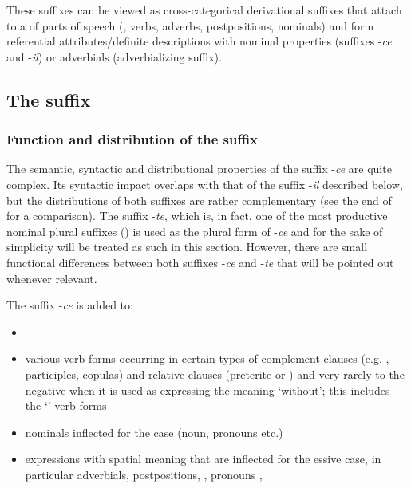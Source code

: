 These suffixes can be viewed as cross-categorical derivational suffixes that attach to a  of parts of speech (, verbs, adverbs, postpositions, nominals) and form referential attributes\slash definite descriptions with nominal properties (suffixes -\textit{ce} and -\textit{il}) or adverbials (adverbializing suffix).


\subsection{The suffix  }
\label{ssec:The -ce / -te attributive}
\subsubsection{Function and distribution of the suffix }
\label{sssec:Function and distribution of the suffix -ce}

The semantic, syntactic and distributional properties of the suffix -\textit{ce} are quite complex. Its syntactic impact overlaps with that of the suffix -\textit{il} described below, but the distributions of both suffixes are rather complementary (see the end of  for a comparison). The suffix -\textit{te}, which is, in fact, one of the most productive nominal plural suffixes () is used as the plural form of -\textit{ce} and for the sake of simplicity will be treated as such in this section. However, there are small functional differences between both suffixes -\textit{ce} and -\textit{te} that will be pointed out whenever relevant.

The suffix -\textit{ce} is added to: 

\begin{itemize}
	\item	{} 
	\item	various verb forms occurring in certain types of complement clauses (e.g. , participles, copulas) and relative clauses (preterite or ) and very rarely to the negative  when it is used as expressing the meaning `without'; this includes the `' verb forms 
		\item nominals inflected for the  case (noun, pronouns etc.) 
	\item	expressions with spatial meaning that are inflected for the essive case, in particular adverbials, postpositions, , pronouns , 
\end{itemize}

